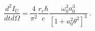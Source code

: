 \begin{equation}\label{ct99-19}
\frac{d^2I_U}{dtd\Omega}=\frac{4}{\pi ^2}\frac{r_{e}\hbar}{c}\frac{\omega _0^3a_0^3}{[1+a_0^2\theta ^2]^3}~.
\end{equation}

